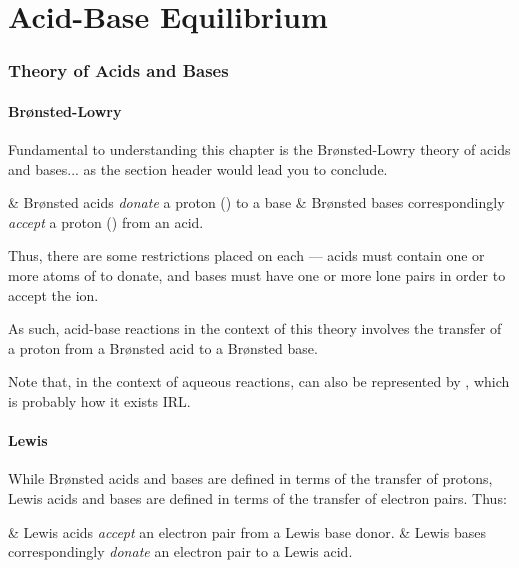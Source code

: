 

\pagebreak
\part{Acid-Base Equilibrium}

	\section{Theory of Acids and Bases}

		\subsection{Brønsted-Lowry}

			Fundamental to understanding this chapter is the Brønsted-Lowry theory of acids and bases... as the section header would lead you
			to conclude.

			\begin{bulletlist}
				& Brønsted acids \textit{donate} a proton () to a base
				& Brønsted bases correspondingly \textit{accept} a proton () from an acid.
			\end{bulletlist}

			Thus, there are some restrictions placed on each --- acids must contain one or more atoms of  to donate, and bases must have
			one or more lone pairs in order to accept the \ch{H+} ion.

			As such, acid-base reactions in the context of this theory involves the transfer of a proton from a Brønsted acid to a Brønsted base.

			Note that, in the context of aqueous reactions,  can also be represented by , which is probably how it exists IRL.


		\subsection{Lewis}

			While Brønsted acids and bases are defined in terms of the transfer of protons, Lewis acids and bases are defined in terms of the
			transfer of electron pairs. Thus:

			\begin{bulletlist}
				& Lewis acids \textit{accept} an electron pair from a Lewis base donor.
				& Lewis bases correspondingly \textit{donate} an electron pair to a Lewis acid.
			\end{bulletlist}

